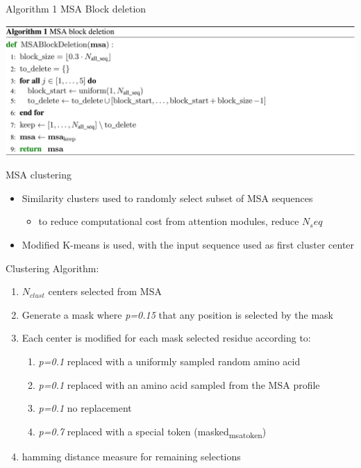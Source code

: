 \documentclass[presentation, smaller]{beamer}
\begin{document}
\begin{frame}[label={sec:orga1c355b}]{Algorithm 1 MSA Block deletion \cite{jumperHighlyAccurateProtein2021}}
\begin{center}
\includegraphics[width=.9\linewidth]{./imgs/algo1_block_deletion.png}
\end{center}
\end{frame}
\begin{frame}[label={sec:orgb478d1d}]{MSA clustering \cite{jumperHighlyAccurateProtein2021}}
\begin{itemize}
\item Similarity clusters used to randomly select subset of MSA sequences 
\begin{itemize}
\item to reduce computational cost from attention modules, reduce \(N_seq\)
\end{itemize}
\item Modified K-means is used, with the input sequence used as first cluster center
\end{itemize}

Clustering Algorithm:
\begin{enumerate}
\item \(N_{clust}\) centers selected from MSA
\item Generate a mask where \emph{p=0.15} that any position is selected by the mask
\item Each center is modified for each mask selected residue according to:
\begin{enumerate}
\item \emph{p=0.1} replaced with a uniformly sampled random amino acid
\item \emph{p=0.1} replaced with an amino acid sampled from the MSA profile
\item \emph{p=0.1} no replacement
\item \emph{p=0.7} replaced with a special token (masked\textsubscript{msa}\textsubscript{token})
\end{enumerate}
\item hamming distance measure for remaining selections
\end{enumerate}
\end{frame}
\end{document}
